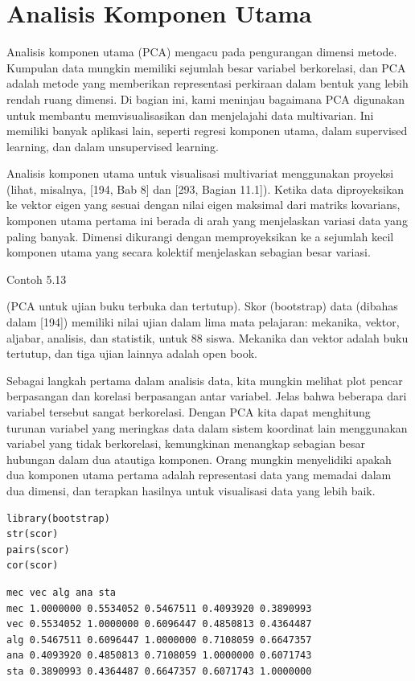 \documentclass[a4paper,12pt]{article}
\theoremstyle{definition}
\begin{document}
\section{Analisis Komponen Utama}

  Analisis komponen utama (PCA) mengacu pada pengurangan dimensi metode. Kumpulan data mungkin memiliki sejumlah besar variabel berkorelasi, dan PCA adalah metode yang memberikan representasi perkiraan dalam bentuk yang lebih rendah ruang dimensi. Di bagian ini, kami meninjau bagaimana PCA digunakan untuk membantu memvisualisasikan dan menjelajahi data multivarian. Ini memiliki banyak aplikasi lain, seperti regresi komponen utama, dalam supervised learning, dan dalam unsupervised learning.

  Analisis komponen utama untuk visualisasi multivariat menggunakan proyeksi (lihat, misalnya, [194, Bab 8] dan [293, Bagian 11.1]). Ketika data diproyeksikan ke vektor eigen yang sesuai dengan nilai eigen maksimal dari matriks kovarians, komponen utama pertama ini berada di arah yang menjelaskan variasi data yang paling banyak. Dimensi dikurangi dengan memproyeksikan ke a sejumlah kecil komponen utama yang secara kolektif menjelaskan sebagian besar variasi. 

Contoh 5.13

(PCA untuk ujian buku terbuka dan tertutup). Skor (bootstrap) data (dibahas dalam [194]) memiliki nilai ujian dalam lima mata pelajaran: mekanika, vektor, aljabar, analisis, dan statistik, untuk 88 siswa. Mekanika dan vektor adalah buku tertutup, dan tiga ujian lainnya adalah open book.

 Sebagai langkah pertama dalam analisis data, kita mungkin melihat plot pencar berpasangan dan korelasi berpasangan antar variabel. Jelas bahwa beberapa dari variabel tersebut sangat berkorelasi. Dengan PCA kita dapat menghitung turunan variabel yang meringkas data dalam sistem koordinat lain menggunakan variabel yang tidak berkorelasi, kemungkinan menangkap sebagian besar hubungan dalam dua atautiga komponen. Orang mungkin menyelidiki apakah dua komponen utama pertama adalah representasi data yang memadai dalam dua dimensi, dan terapkan hasilnya untuk visualisasi data yang lebih baik.

 \begin{lstlisting}
library(bootstrap)
str(scor)
pairs(scor)
cor(scor)
\end{lstlisting}

\begin{verbatim}
mec vec alg ana sta
mec 1.0000000 0.5534052 0.5467511 0.4093920 0.3890993
vec 0.5534052 1.0000000 0.6096447 0.4850813 0.4364487
alg 0.5467511 0.6096447 1.0000000 0.7108059 0.6647357
ana 0.4093920 0.4850813 0.7108059 1.0000000 0.6071743
sta 0.3890993 0.4364487 0.6647357 0.6071743 1.0000000    
\end{verbatim}
\end{document}
